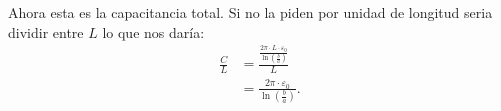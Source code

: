 \documentclass{report}
\begin{document}
Ahora esta es la capacitancia total. Si no la piden por unidad de longitud seria dividir entre $L$ lo que nos daría:
 \begin{align*}
  \frac{C}{L} &= \frac{\frac{2\pi\cdot L \cdot \varepsilon_0}{\ln\left( \frac{b}{a} \right)}}{L}  \\
   &= \frac{2\pi \cdot \varepsilon_0}{\ln\left( \frac{b}{a} \right)} 
.\end{align*}
\end{document}
